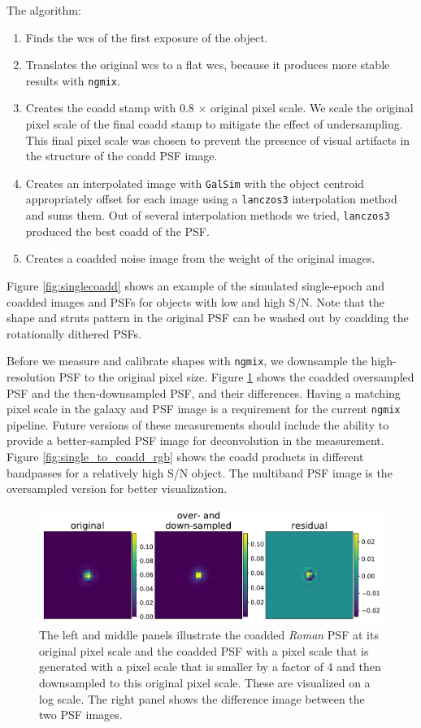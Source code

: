 \documentclass[fleqn,usenatbib]{mnras}
\begin{document}
The algorithm: 
\begin{enumerate}
    \setlength\itemsep{1em}
    \item Finds the wcs of the first exposure of the object.
    \item Translates the original wcs to a flat wcs, because it produces more stable results with \texttt{ngmix}.
    \item Creates the coadd stamp with 0.8 $\times$ original pixel scale. We scale the original pixel scale of the final coadd stamp to mitigate the effect of undersampling. This final pixel scale was chosen to prevent the presence of visual artifacts in the structure of the coadd PSF image. 
    \item Creates an interpolated image with \texttt{GalSim} with the object centroid appropriately offset for each image using a \texttt{lanczos3} interpolation method and sums them. Out of several interpolation methods we tried, \texttt{lanczos3} produced the best coadd of the PSF.
    \item Creates a coadded noise image from the weight of the original images. 
\end{enumerate}
Figure \ref{fig:singlecoadd} shows an example of the simulated single-epoch and coadded images and PSFs for objects with low and high S/N. Note that the shape and struts pattern in the original PSF can be washed out by coadding the rotationally dithered PSFs. 


Before we measure and calibrate shapes with \texttt{ngmix}, we downsample the high-resolution PSF to the original pixel size. Figure \ref{fig:coadd_oversample_res} shows the coadded oversampled PSF and the then-downsampled PSF, and their differences. Having a matching pixel scale in the galaxy and PSF image is a requirement for the current \texttt{ngmix} pipeline. Future versions of these measurements should include the ability to provide a better-sampled PSF image for deconvolution in the measurement. Figure \ref{fig:single_to_coadd_rgb} shows the coadd products in different bandpasses for a relatively high S/N object. The multiband PSF image is the oversampled version for better visualization. 


\begin{figure}
	\includegraphics[width=\columnwidth]{psf_differences_v2.pdf}
    \caption{The left and middle panels illustrate the coadded \emph{Roman} PSF at its original pixel scale and the coadded PSF with a pixel scale that is generated with a pixel scale that is smaller by a factor of 4 and then downsampled to this original pixel scale. These are visualized on a log scale. The right panel shows the difference image between the two PSF images. }
    \label{fig:coadd_oversample_res}
\end{figure}
\end{document}
